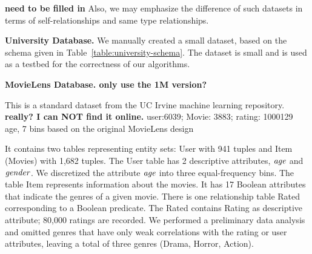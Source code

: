 \documentclass{article}
\begin{document}
\textbf{need to be filled in}
Also, we may emphasize the difference of such datasets in terms of self-relationships and same type relationships.

\noindent\textbf{University Database.} We manually created a small dataset, based on the schema given in Table~\ref{table:university-schema}. 
The dataset is small and is used as a testbed for the correctness of our algorithms.

\noindent\textbf{MovieLens Database. only use the 1M version?} 

This is a standard dataset from the UC Irvine machine learning repository.  \textbf{really? I can NOT find it online.}
user:6039; Movie: 3883; rating: 1000129
age, 7 bins based on the original MovieLens design

It contains two tables representing entity sets: User with 941 tuples and Item (Movies) with 1,682 tuples.
The User table has 2 descriptive attributes, $\mathit{age}$ and $\it{gender}$. We discretized the attribute $\mathit{age}$ into three equal-frequency bins. The table Item represents information about the movies. It has 17 Boolean attributes that indicate the genres of a given movie. There is one relationship table Rated corresponding to a Boolean predicate. The Rated contains Rating as descriptive attribute; 80,000 ratings are recorded.  We performed a preliminary data analysis and omitted genres that have only weak correlations with the rating or user attributes, leaving a total of three genres (Drama, Horror, Action).
%
\end{document}
